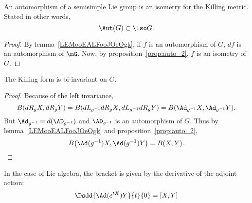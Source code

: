 \begin{corollary}
	An automorphism of a semisimple Lie group is an isometry for the Killing metric. Stated in other words,
	\begin{equation}\label{eq:Aut_Iso}
		\Aut(G)\subset\Iso G.
	\end{equation}
\end{corollary}

\begin{proof}
	By lemma~\ref{LEMooEALFooJOeOgk}, if $f$ is an automorphism of $G$, $df$ is an automorphism of $\mG$. Now, by proposition~\ref{prop:auto_2}, $f$ is an isometry of $G$.
\end{proof}

\begin{theorem}
	The Killing form is bi-invariant on $G$.
	\label{tho:bi_invariance}
\end{theorem}

\begin{proof}
	Because of the left invariance,
	\[
		B(dR_gX,dR_gY)=B(dL_{g^{-1}}dR_gX,dL_{g^{-1}}dR_gY)=B(\Ad_{g^{-1}}X,\Ad_{g^{-1}}Y).
	\]
	But $\Ad_{g^{-1}}=d(\AD_{g^{-1}})$ and $\AD_{g^{-1}}$ is an automorphism of $G$. Thus by lemma~\ref{LEMooEALFooJOeOgk} and proposition~\ref{prop:auto_2},
	\begin{equation}                    \label{eq_KillAdinvariant}
		B\big(\Ad(g^{-1})X,\Ad(g^{-1})Y\big)=B(X,Y).
	\end{equation}
\end{proof}

\begin{lemma}
	In the case of Lie algebra, the bracket is given by the derivative of the adjoint action:
	\begin{equation}
		\Dsdd{ \Ad( e^{tX})Y }{t}{0}=[X,Y]
	\end{equation}
\end{lemma}


